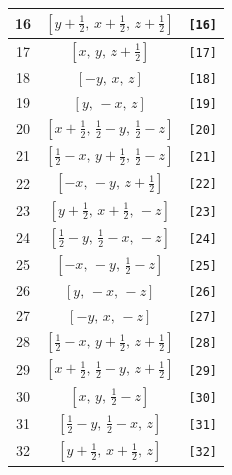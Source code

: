 \documentclass[fleqn,8pt]{jsarticle}
\begin{document}
\begin{longtable}{ccc}
16 & $\left[ y + \frac{1}{2},\, x + \frac{1}{2},\, z + \frac{1}{2} \right]$ & {\tt [16]} \\ \hline
17 & $\left[ x,\, y,\, z + \frac{1}{2} \right]$ & {\tt [17]} \\ \hline
18 & $\left[ - y,\, x,\, z \right]$ & {\tt [18]} \\ \hline
19 & $\left[ y,\, - x,\, z \right]$ & {\tt [19]} \\ \hline
20 & $\left[ x + \frac{1}{2},\, \frac{1}{2} - y,\, \frac{1}{2} - z \right]$ & {\tt [20]} \\ \hline
21 & $\left[ \frac{1}{2} - x,\, y + \frac{1}{2},\, \frac{1}{2} - z \right]$ & {\tt [21]} \\ \hline
22 & $\left[ - x,\, - y,\, z + \frac{1}{2} \right]$ & {\tt [22]} \\ \hline
23 & $\left[ y + \frac{1}{2},\, x + \frac{1}{2},\, - z \right]$ & {\tt [23]} \\ \hline
24 & $\left[ \frac{1}{2} - y,\, \frac{1}{2} - x,\, - z \right]$ & {\tt [24]} \\ \hline
25 & $\left[ - x,\, - y,\, \frac{1}{2} - z \right]$ & {\tt [25]} \\ \hline
26 & $\left[ y,\, - x,\, - z \right]$ & {\tt [26]} \\ \hline
27 & $\left[ - y,\, x,\, - z \right]$ & {\tt [27]} \\ \hline
28 & $\left[ \frac{1}{2} - x,\, y + \frac{1}{2},\, z + \frac{1}{2} \right]$ & {\tt [28]} \\ \hline
29 & $\left[ x + \frac{1}{2},\, \frac{1}{2} - y,\, z + \frac{1}{2} \right]$ & {\tt [29]} \\ \hline
30 & $\left[ x,\, y,\, \frac{1}{2} - z \right]$ & {\tt [30]} \\ \hline
31 & $\left[ \frac{1}{2} - y,\, \frac{1}{2} - x,\, z \right]$ & {\tt [31]} \\ \hline
32 & $\left[ y + \frac{1}{2},\, x + \frac{1}{2},\, z \right]$ & {\tt [32]} \\
\end{longtable}
\end{document}
